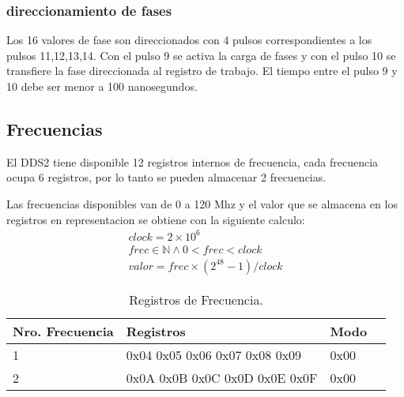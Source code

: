 \subsubsection{direccionamiento de fases}
Los 16 valores de fase son direccionados con 4 pulsos correspondientes a los 
pulsos 11,12,13,14. Con el pulso 9 se activa la carga de fases y con el pulso 10
se transfiere la fase direccionada al registro de trabajo.
El tiempo entre el pulso 9 y 10 debe ser menor a 100 nanosegundos.

\subsection{Frecuencias}

El DDS2 tiene disponible 12 registros internos de frecuencia, cada frecuencia ocupa 6 registros, 
por lo tanto se pueden almacenar 2 frecuencias.

Las frecuencias disponibles van de 0 a 120 Mhz y el valor que se almacena en los registros
en representacion se obtiene con la siguiente calculo:
\noindent
\begin{gather}
    clock = 2 \times 10^{6} \\
    frec \in \mathbb{N} \land 0 < frec < clock\\
    valor = frec \times (2^{48} -1 ) / clock
\end{gather}

\begin{table}[ht]
    \centering
    \begin{tabular}{|l|l|l|l|}
    \hline
    Nro. Frecuencia    & Registros       & Modo \\
    \hline
     1 & 0x04 0x05 0x06 0x07 0x08 0x09   & 0x00 \\
    \hline
     2 & 0x0A 0x0B 0x0C 0x0D 0x0E 0x0F   & 0x00 \\
    \hline
\end{tabular}
\caption{\label{tab:registros_frec}Registros de Frecuencia.}
\end{table}

